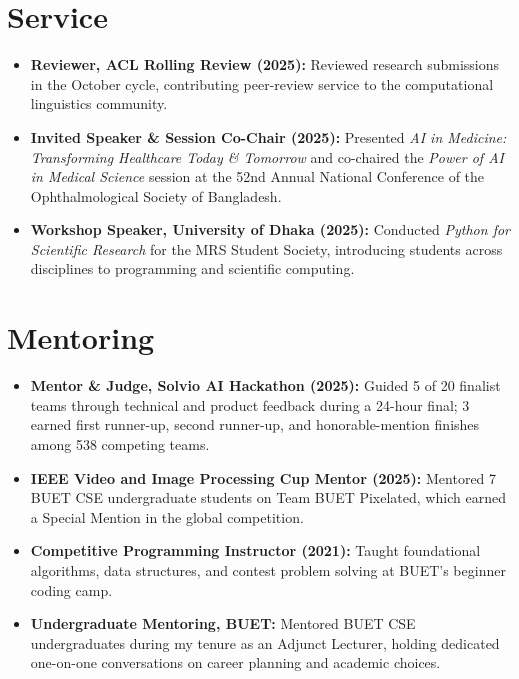 \documentclass[10pt,letterpaper]{article}
\newenvironment{highlights}
    {\begin{itemize}[
        topsep=0.18em,
        parsep=0pt,
        partopsep=0pt,
        itemsep=0.42em,
        leftmargin=1.15em
    ]}
    {\end{itemize}}
\newenvironment{entry}
    {\begin{minipage}{\linewidth}\color{textColor}}
    {\end{minipage}}
\begin{document}
\newpage
\section{Service}
\begin{entry}
\begin{highlights}
    \item \textbf{Reviewer, ACL Rolling Review (2025):} Reviewed research submissions in the October cycle, contributing peer-review service to the computational linguistics community.
    \item \textbf{Invited Speaker \& Session Co-Chair (2025):} Presented \textit{AI in Medicine: Transforming Healthcare Today \& Tomorrow} and co-chaired the \textit{Power of AI in Medical Science} session at the 52nd Annual National Conference of the Ophthalmological Society of Bangladesh.
    \item \textbf{Workshop Speaker, University of Dhaka (2025):} Conducted \textit{Python for Scientific Research} for the MRS Student Society, introducing students across disciplines to programming and scientific computing.
\end{highlights}
\end{entry}

\section{Mentoring}
\begin{entry}
\begin{highlights}
    \item \textbf{Mentor \& Judge, Solvio AI Hackathon (2025):} Guided 5 of 20 finalist teams through technical and product feedback during a 24-hour final; 3 earned first runner-up, second runner-up, and honorable-mention finishes among 538 competing teams.
    \item \textbf{IEEE Video and Image Processing Cup Mentor (2025):} Mentored 7 BUET CSE undergraduate students on Team BUET Pixelated, which earned a Special Mention in the global competition.
    \item \textbf{Competitive Programming Instructor (2021):} Taught foundational algorithms, data structures, and contest problem solving at BUET's beginner coding camp.
    \item \textbf{Undergraduate Mentoring, BUET:} Mentored BUET CSE undergraduates during my tenure as an Adjunct Lecturer, holding dedicated one-on-one conversations on career planning and academic choices.
\end{highlights}
\end{entry}
\vspace{-0.55em}
\end{document}

